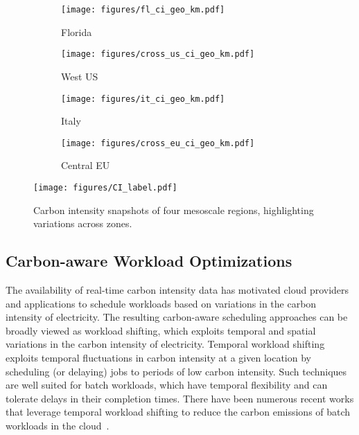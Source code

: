 \begin{figure*}[t]
    \centering%
    \hfill
    \begin{subfigure}{0.225\linewidth}%
        \centering
        \texttt{[image: figures/fl\_ci\_geo\_km.pdf]}%
        \caption{Florida}
        \label{fig:cv_snapshot_r1}
    \end{subfigure}%
    \hfill
    \begin{subfigure}{0.21\linewidth}%
        \centering
        \texttt{[image: figures/cross\_us\_ci\_geo\_km.pdf]}%
        \caption{West US}
        \label{fig:cv_snapshot_r2}
    \end{subfigure}%
    \hfill
    \begin{subfigure}{0.19\linewidth}%
        \centering
        \texttt{[image: figures/it\_ci\_geo\_km.pdf]}%
        \caption{Italy}
        \label{fig:cv_snapshot_r3}
    \end{subfigure}%
    \hfill
    \begin{subfigure}{0.175\linewidth}%
        \centering
        \texttt{[image: figures/cross\_eu\_ci\_geo\_km.pdf]}%
        \caption{Central EU}
        \label{fig:cv_snapshot_r4}
    \end{subfigure}%
    \texttt{[image: figures/CI\_label.pdf]}
    \hfill
    \hfill 
    \caption{Carbon intensity snapshots of four mesoscale regions, highlighting variations across zones.}%
    \label{fig:cv_snapshot}%
    \vspace{-.4cm}
\end{figure*}

\subsection{Carbon-aware Workload Optimizations}

The availability of real-time carbon intensity data has motivated cloud providers and applications to schedule workloads based on variations in the carbon intensity of electricity. The resulting carbon-aware scheduling approaches can be broadly viewed as workload shifting, which exploits temporal and spatial variations in the carbon intensity of electricity. Temporal workload shifting exploits temporal fluctuations in carbon intensity at a given location by scheduling (or delaying) jobs to periods of low carbon intensity. Such techniques are well suited for batch workloads, which have temporal flexibility and can tolerate delays in their completion times.  There have been numerous recent works that leverage temporal workload shifting to reduce the carbon emissions of batch workloads in the cloud~\cite{acun2023carbon, wait-awhile, sukprasert2024limitations, ecovisor, hanafy2023carbonscaler}.  %

